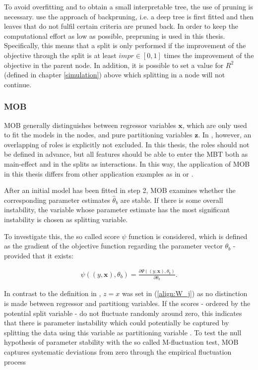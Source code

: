 To avoid overfitting and to obtain a small interpretable tree, the use of pruning is necessary. \citet{Hu.2020} use the approach of backpruning, i.e. a deep tree is first fitted and then leaves that do not fulfil certain criteria are pruned back. 
In order to keep the computational effort as low as possible, prepruning is used in this thesis. Specifically, this means that a split is only performed if the improvement of the objective through the split is at least $impr \in [0,1]$ times the improvement of the objective in the parent node. In addition, it is possible to set a value for $R^2$ (defined in chapter \ref{simulation}) above which splitting in a node will not continue.





\subsubsection{MOB}
MOB generally distinguishes between regressor variables $\mathbf{x}$, which are only used to fit the models in the nodes, and pure partitioning variables $\mathbf{z}$. In \citep{Zeileis.2008}, however, an overlapping of roles is explicitly not excluded. 
In this thesis, the roles should not be defined in advance, but all features should be able to enter the MBT both as main-effect and in the splits as interactions.
In this way, the application of MOB in this thesis differs from other application examples as in \citet{Seibold.2016} or \citet{Thomas.2018}. 



After an initial model has been fitted in step 2, MOB examines whether the corresponding parameter estimates $\hat{\theta}_b$ are stable. If there is some overall instability, the variable whose parameter estimate has the most significant instability is chosen as splitting variable.

To investigate this, the so called score $\psi$ function is considered, which is defined as the
gradient of the objective function regarding the parameter vector $\theta_b$ - provided that it exists:

\begin{align}
    \psi \left( \left(y, \mathbf{x} \right), \theta_b \right) = \frac{\partial \Psi\left( \left(y, \mathbf{x} \right), \theta_b \right)}{\partial \theta_b}.
\end{align}

\citep{Zeileis.2008}


In contrast to the definition in \citet{Zeileis.2008}, $z = x$ was set in (\ref{align:W_j}) as no distinction is made between regressor and partitiong variables.
If the scores - ordered by the potential split variable - do not fluctuate randomly around zero, this indicates that there is parameter instability which could potentially be captured by splitting the data using this variable as partitioning variable \citep{Schlosser.2019}.
To test the null hypothesis of parameter stability with the so called M-fluctuation test, MOB captures systematic deviations from zero through the empirical fluctuation process

